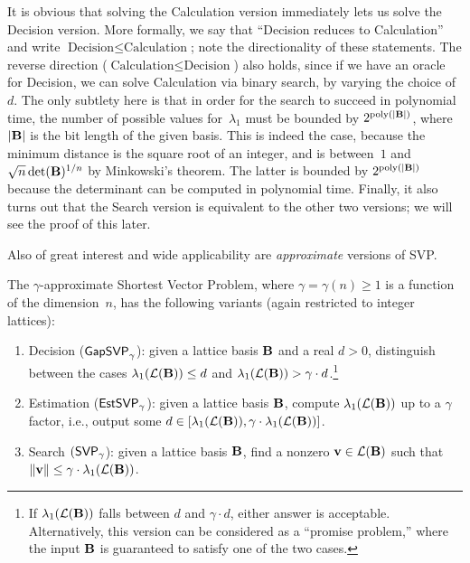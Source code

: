 \documentclass[11pt]{article}
\begin{document}
It is obvious that solving the Calculation version immediately lets us
solve the Decision version. More formally, we say that ``Decision
reduces to Calculation'' and write
$\text{Decision} \leq \text{Calculation}$; note the directionality of
these statements. The reverse direction
($\text{Calculation} \leq \text{Decision}$) also holds, since if we
have an oracle for Decision, we can solve Calculation via binary
search, by varying the choice of~$d$. The only subtlety here is that
in order for the search to succeed in polynomial time, the number of
possible values for~$\lambda_{1}$ must be bounded by
$2^{\operatorname{poly}(\lvert\mathbf{B}\rvert)}$, where $\lvert\mathbf{B}\rvert$ is the bit length of the
given basis. This is indeed the case, because the minimum distance is
the square root of an integer, and is between~$1$ and
$\sqrt{n} \det(\mathbf{B})^{1/n}$ by Minkowski's theorem. The latter is
bounded by $2^{\operatorname{poly}(\lvert\mathbf{B}\rvert)}$ because the determinant can be
computed in polynomial time. Finally, it also turns out that the
Search version is equivalent to the other two versions; we will see
the proof of this later.

\medskip \noindent Also of great interest and wide applicability are
\emph{approximate} versions of SVP.

\begin{definition}
  The $\gamma$-approximate Shortest Vector Problem, where
  $\gamma = \gamma(n) \geq 1$ is a function of the dimension~$n$, has
  the following variants (again restricted to integer lattices):
  \begin{enumerate}[itemsep=0pt]
  \item Decision ($\mathsf{GapSVP}_{\gamma}$): given a lattice basis $\mathbf{B}$
    and a real $d > 0$, distinguish between the cases
    $\lambda_1(\mathcal{L}(\mathbf{B})) \leq d$ and
    $\lambda_1(\mathcal{L}(\mathbf{B})) > \gamma\cdot d$.\footnote{If
      $\lambda_1(\mathcal{L}(\mathbf{B}))$ falls between $d$ and $\gamma\cdot d$,
      either answer is acceptable. Alternatively, this version can be
      considered as a ``promise problem,'' where the input $\mathbf{B}$ is
      guaranteed to satisfy one of the two cases.}
    
  \item Estimation ($\mathsf{EstSVP}_{\gamma}$): given a lattice basis
    $\mathbf{B}$, compute $\lambda_1(\mathcal{L}(\mathbf{B}))$ up to a $\gamma$ factor,
    i.e., output some
    $d \in [\lambda_1(\mathcal{L}(\mathbf{B})),
    \gamma\cdot\lambda_1(\mathcal{L}(\mathbf{B}))]$.
    
  \item Search $(\mathsf{SVP}_{\gamma}$): given a lattice basis $\mathbf{B}$, find
    a nonzero $\mathbf{v} \in \mathcal{L}(\mathbf{B})$ such that
    $\lVert\mathbf{v}\rVert \leq \gamma\cdot \lambda_1(\mathcal{L}(\mathbf{B}))$.
  \end{enumerate}
\end{definition}
\end{document}
